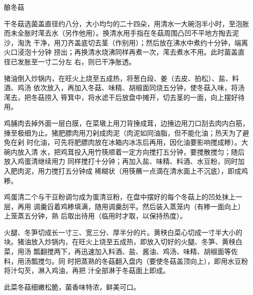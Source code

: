 \begin{recipe}{酿冬菇}

\ingredients


\preparation

\step 干冬菇选菌盖直径约八分，大小均匀的二十四朵，用清水一大碗泡半小时，至泡胀
而未全胀时滗去水（另作他用）。换清水用手指在冬菇周围凸凹不平地方掏去泥沙，淘洗
干净，用刀齐盖底切去茎（作别用）；然后放在沸水中煮约十分钟，端离火口浸泡十分钟
捞出；再换清水烧沸同样再煮一次，滗去煮水不用。此时菌盖直径已发胀至一寸二分左
右，则已干净胀透。

猪油倒入炒锅内，在旺火上烧至五成热，将葱白段、姜（去皮、拍松）、盐、料酒、鸡汤
依次放入，再加入冬菇、味精、胡椒面同烧五分钟，使冬菇入味，将汤滗去，把冬菇捞入
筲箕中，将水滤干后放盘中摊开，切去茎的一面，向上摆好待用。

\step 鸡脯肉去掉外面一层白膜，在菜墩上用刀背捶成茸，边捶边用刀口刮去肉内白筋，
捶至极细为止。猪肥膘肉用刀剁成肉泥（肉泥如同油脂，但不能化油；热天为了避免在剁
时化油，可先将肥膘肉放在冰箱内冰冻后再用，因化油要影响搅成糁）。大碗内放入清
水，把鸡茸投入用竹筷顺着一定方向搅打五分钟，要搅散搅匀；随后放入鸡蛋清继续用力
同样搅打十分钟；再加入盐、味精、料酒、水豆粉，同时加入肥肉泥，用力搅打五分钟成
稀糊状（用筷蘸一点滴在清水面上不沉底），即成鸡糁。

鸡蛋清二个与干豆粉调匀成为蛋清豆粉，在盘中摆好的每个冬菇上的凹处抹上一层，再用
调羹舀着鸡糁填满，随用调羹刮平。然后装入蒸笼内（有糁一面向上）上笼蒸五分钟，熟
后取出待用（临用时才取，以保持热度）。

\step 火腿、冬笋切成长一寸三、宽三分、厚半分的片。黄秧白菜心切成一寸半大小的
块。猪油放入炒锅内，在旺火上烧至五成热，即放入切好的火腿、冬笋、黄秧白菜，用汤
瓢翻搅两下，再迅速加入料酒、盐、酱油、鸡汤、味精、胡椒面等佐料，用汤瓢搅匀。同
时把蒸熟的冬菇翻入盘内（要使冬菇盖顶向上），即用水豆粉将汁勾芡，淋入鸡油，再把
汁全部淋于冬菇面上即成。

\features

此菜冬菇细嫩松脆，菌香味特浓，鲜美可口。

\end{recipe}

